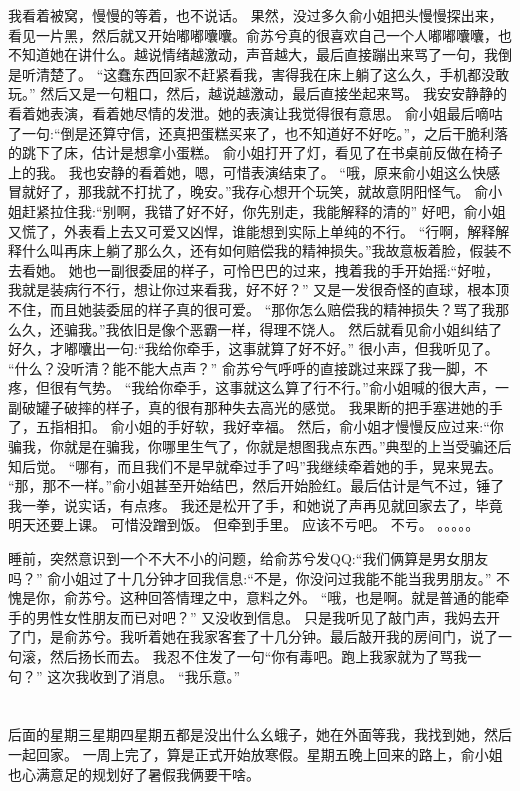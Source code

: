 我看着被窝，慢慢的等着，也不说话。
果然，没过多久俞小姐把头慢慢探出来，看见一片黑，然后就又开始嘟嘟囔囔。俞苏兮真的很喜欢自己一个人嘟嘟囔囔，也不知道她在讲什么。越说情绪越激动，声音越大，最后直接蹦出来骂了一句，我倒是听清楚了。
“这蠢东西回家不赶紧看我，害得我在床上躺了这么久，手机都没敢玩。”
然后又是一句粗口，然后，越说越激动，最后直接坐起来骂。
我安安静静的看着她表演，看着她尽情的发泄。她的表演让我觉得很有意思。
俞小姐最后嘀咕了一句:“倒是还算守信，还真把蛋糕买来了，也不知道好不好吃。”，之后干脆利落的跳下了床，估计是想拿小蛋糕。
俞小姐打开了灯，看见了在书桌前反做在椅子上的我。
我也安静的看着她，嗯，可惜表演结束了。
“哦，原来俞小姐这么快感冒就好了，那我就不打扰了，晚安。”我存心想开个玩笑，就故意阴阳怪气。
俞小姐赶紧拉住我:“别啊，我错了好不好，你先别走，我能解释的清的”
好吧，俞小姐又慌了，外表看上去又可爱又凶悍，谁能想到实际上单纯的不行。
“行啊，解释解释什么叫再床上躺了那么久，还有如何赔偿我的精神损失。”我故意板着脸，假装不去看她。
她也一副很委屈的样子，可怜巴巴的过来，拽着我的手开始摇:“好啦，我就是装病行不行，想让你过来看我，好不好？”
又是一发很奇怪的直球，根本顶不住，而且她装委屈的样子真的很可爱。
“那你怎么赔偿我的精神损失？骂了我那么久，还骗我。”我依旧是像个恶霸一样，得理不饶人。
然后就看见俞小姐纠结了好久，才嘟囔出一句:“我给你牵手，这事就算了好不好。”
很小声，但我听见了。
“什么？没听清？能不能大点声？”
俞苏兮气呼呼的直接跳过来踩了我一脚，不疼，但很有气势。
“我给你牵手，这事就这么算了行不行。”俞小姐喊的很大声，一副破罐子破摔的样子，真的很有那种失去高光的感觉。
我果断的把手塞进她的手了，五指相扣。
俞小姐的手好软，我好幸福。
然后，俞小姐才慢慢反应过来:“你骗我，你就是在骗我，你哪里生气了，你就是想图我点东西。”典型的上当受骗还后知后觉。
“哪有，而且我们不是早就牵过手了吗”我继续牵着她的手，晃来晃去。
“那，那不一样。”俞小姐甚至开始结巴，然后开始脸红。最后估计是气不过，锤了我一拳，说实话，有点疼。
我还是松开了手，和她说了声再见就回家去了，毕竟明天还要上课。
可惜没蹭到饭。
但牵到手里。
应该不亏吧。
不亏。
。。。。。

睡前，突然意识到一个不大不小的问题，给俞苏兮发QQ:“我们俩算是男女朋友吗？”
俞小姐过了十几分钟才回我信息:“不是，你没问过我能不能当我男朋友。”
不愧是你，俞苏兮。这种回答情理之中，意料之外。
“哦，也是啊。就是普通的能牵手的男性女性朋友而已对吧？”
又没收到信息。
只是我听见了敲门声，我妈去开了门，是俞苏兮。我听着她在我家客套了十几分钟。最后敲开我的房间门，说了一句滚，然后扬长而去。
我忍不住发了一句“你有毒吧。跑上我家就为了骂我一句？”
这次我收到了消息。
“我乐意。”

\chapter{}
后面的星期三星期四星期五都是没出什么幺蛾子，她在外面等我，我找到她，然后一起回家。
一周上完了，算是正式开始放寒假。星期五晚上回来的路上，俞小姐也心满意足的规划好了暑假我俩要干啥。

